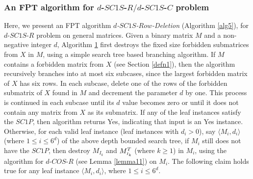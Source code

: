 \documentclass[review, 1p]{elsarticle}
\begin{document}
\subsubsection{\textup{\textbf{An FPT algorithm for $d$-$SC1S$-$R/d$-$SC1S$-$C$ problem}} \label{fptr/c}} 
\noindent Here, we present an FPT algorithm \textit{$d$-$SC1S$-$Row$-Deletion} (Algorithm \ref{alg5}), for $d$-$SC1S$-$R$ problem on general matrices. Given a binary matrix $M$ and a non-negative integer $d$, Algorithm \hyperref[alg5]{1} first destroys the fixed size forbidden submatrices from $X$ in $M$, using a simple search tree based branching algorithm. If $M$ contains a forbidden matrix from $X$ (see Section \ref{defn1}), then the algorithm recursively branches into at most six subcases, since the largest forbidden matrix of $X$ has six rows. In each subcase, delete one of the rows of the forbidden submatrix of $X$ found in $M$ and decrement the parameter $d$ by one. This process is continued in each subcase until its $d$ value becomes zero or until it does not contain any matrix from $X$ as its submatrix. If any of the leaf instances satisfy the $SC1P$, then algorithm returns Yes, indicating that input is an Yes instance. Otherwise, for each  valid leaf instance (leaf instances with $d_{i} >0$), say $\langle M_{i}, d_{i} \rangle$ (where $1 \leq i \leq 6^{d}$) of the above depth bounded search tree, if $M_{i}$ still does not have the $SC1P$, then destroy $M_{I_{k}}$ and $M^{T}_{\mathsmaller{I_{k}}}$ (where $k \geq 1$) in $M_{i}$, using the algorithm for $d$-$COS$-$R$ (see Lemma \ref{lemma11}) on $M_{i}$. The following claim holds true for any leaf instance $\langle M_{i}, d_{i} \rangle$, where $1 \leq i \leq 6^{d}$.
\end{document}
